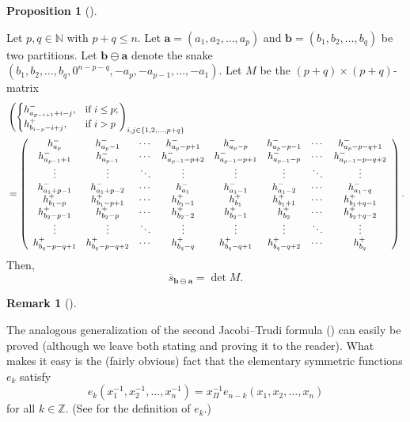 \documentclass[numbers=enddot,12pt,final,onecolumn,notitlepage]{scrartcl}%
\theoremstyle{definition}
\newtheorem{prop}[theo]{Proposition}
\newenvironment{proposition}[1][]
{\begin{prop}[#1]\begin{leftbar}}
{\end{leftbar}\end{prop}}
\newtheorem{remk}[theo]{Remark}
\newenvironment{remark}[1][]
{\begin{remk}[#1]\begin{leftbar}}
{\end{leftbar}\end{remk}}
\begin{document}
\begin{proposition}
\label{prop.jt}Let $p,q\in\mathbb{N}$ with $p+q\leq n$. Let $\mathbf{a}%
=\left(  a_{1},a_{2},\ldots,a_{p}\right)  $ and $\mathbf{b}=\left(
b_{1},b_{2},\ldots,b_{q}\right)  $ be two partitions. Let $\mathbf{b}%
\ominus\mathbf{a}$ denote the snake $\left(  b_{1},b_{2},\ldots,b_{q}%
,0^{n-p-q},-a_{p},-a_{p-1},\ldots,-a_{1}\right)  $. Let $M$ be the $\left(
p+q\right)  \times\left(  p+q\right)  $-matrix%
\begin{align*}
&  \left(
\begin{cases}
h_{a_{p-i+1}+i-j}^{-}, & \text{if }i\leq p;\\
h_{b_{i-p}-i+j}^{+}, & \text{if }i>p
\end{cases}
\right)  _{i,j\in\left\{  1,2,\ldots,p+q\right\}  }\\
&  =\left(
\begin{array}
[c]{cccccccc}%
h_{a_{p}}^{-} & h_{a_{p}-1}^{-} & \cdots & h_{a_{p}-p+1}^{-} & h_{a_{p}-p}^{-}
& h_{a_{p}-p-1}^{-} & \cdots & h_{a_{p}-p-q+1}^{-}\\
h_{a_{p-1}+1}^{-} & h_{a_{p-1}}^{-} & \cdots & h_{a_{p-1}-p+2}^{-} &
h_{a_{p-1}-p+1}^{-} & h_{a_{p-1}-p}^{-} & \cdots & h_{a_{p-1}-p-q+2}^{-}\\
\vdots & \vdots & \ddots & \vdots & \vdots & \vdots & \ddots & \vdots\\
h_{a_{1}+p-1}^{-} & h_{a_{1}+p-2}^{-} & \cdots & h_{a_{1}}^{-} & h_{a_{1}%
-1}^{-} & h_{a_{1}-2}^{-} & \cdots & h_{a_{1}-q}^{-}\\
h_{b_{1}-p}^{+} & h_{b_{1}-p+1}^{+} & \cdots & h_{b_{1}-1}^{+} & h_{b_{1}}^{+}
& h_{b_{1}+1}^{+} & \cdots & h_{b_{1}+q-1}^{+}\\
h_{b_{2}-p-1}^{+} & h_{b_{2}-p}^{+} & \cdots & h_{b_{2}-2}^{+} & h_{b_{2}%
-1}^{+} & h_{b_{2}}^{+} & \cdots & h_{b_{2}+q-2}^{+}\\
\vdots & \vdots & \ddots & \vdots & \vdots & \vdots & \ddots & \vdots\\
h_{b_{q}-p-q+1}^{+} & h_{b_{q}-p-q+2}^{+} & \cdots & h_{b_{q}-q}^{+} &
h_{b_{q}-q+1}^{+} & h_{b_{q}-q+2}^{+} & \cdots & h_{b_{q}}^{+}%
\end{array}
\right)  .
\end{align*}
Then,%
\[
\overline{s}_{\mathbf{b}\ominus\mathbf{a}}=\det M.
\]

\end{proposition}

\begin{remark}
The analogous generalization of the second Jacobi--Trudi formula
(\cite[(2.4.17)]{GriRei}) can easily be proved (although we leave both stating
and proving it to the reader). What makes it easy is the (fairly obvious) fact
that the elementary symmetric functions $e_{k}$ satisfy%
\[
e_{k}\left(  x_{1}^{-1},x_{2}^{-1},\ldots,x_{n}^{-1}\right)  =x_{\Pi}%
^{-1}e_{n-k}\left(  x_{1},x_{2},\ldots,x_{n}\right)
\]
for all $k\in\mathbb{Z}$. (See \cite[Definition 2.2.1]{GriRei} for the
definition of $e_{k}$.)
\end{remark}
\end{document}
